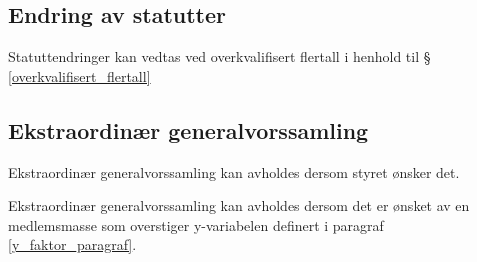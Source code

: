     \subsection{Endring av statutter}
        \begin{statute}
            Statuttendringer kan vedtas ved overkvalifisert flertall i henhold til \S\hspace{3pt}  \ref{overkvalifisert_flertall}
        \end{statute}
        
    \subsection{Ekstraordinær generalvorssamling}
        \begin{statute}
            Ekstraordinær generalvorssamling kan avholdes dersom styret ønsker det.
        \end{statute}
        \begin{statute}
            Ekstraordinær generalvorssamling kan avholdes dersom det er ønsket av en medlemsmasse som overstiger y-variabelen definert i paragraf \ref{y_faktor_paragraf}.
        \end{statute}

